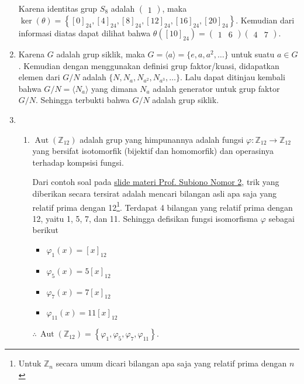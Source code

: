 \documentclass[10pt,openany,a4paper]{article}
\newcommand{\Z}{\mathbb{Z}}
\begin{document}
\begin{enumerate}
\begin{itemize}
    \end{itemize}
    Karena identitas grup $S_8$ adalah $\begin{pmatrix}1\end{pmatrix}$, maka $\ker(\theta)=\left\{[0]_{24},[4]_{24},[8]_{24},[12]_{24},[16]_{24},[20]_{24}\right\}$. Kemudian dari informasi diatas dapat dilihat bahwa $\theta([10]_{24})=\begin{pmatrix}1&6\end{pmatrix}\begin{pmatrix}4&7\end{pmatrix}$.

    \item Karena $G$ adalah grup siklik, maka $G=\langle a \rangle=\{e,a,a^2,\dots\}$ untuk suatu $a\in G$. Kemudian dengan menggunakan definisi grup faktor/kuasi, didapatkan elemen dari $G/N$ adalah $\{N,N_a, N_{a^2}, N_{a^3}, \dots\}$. Lalu dapat ditinjau kembali bahwa $G/N=\langle N_a \rangle$ yang dimana $N_a$ adalah generator untuk grup faktor $G/N$. Sehingga terbukti bahwa $G/N$ adalah grup siklik.

    \item \begin{enumerate}
        \item $\operatorname{Aut}(\mathbb{Z}_{12})$ adalah grup yang himpunannya adalah fungsi $\varphi: \Z_{12}\to \Z_{12}$ yang bersifat isotomorfik (bijektif dan homomorfik) dan operasinya terhadap kompsisi fungsi. 
        
        Dari contoh soal pada \hyperlink{https://sites.google.com/view/aljabar-i/grup/automorpisma-grup?authuser=0}{slide materi Prof. Subiono Nomor 2}, trik yang diberikan secara tersirat adalah mencari bilangan asli apa saja yang relatif prima dengan 12\footnote{Untuk $\Z_n$ secara umum dicari bilangan apa saja yang relatif prima dengan $n$}. Terdapat 4 bilangan yang relatif prima dengan 12, yaitu 1, 5, 7, dan 11. Sehingga defisikan fungsi isomorfisma $\varphi$ sebagai berikut
        \begin{itemize}
            \item $\varphi_1(x)=[x]_{12}$
            \item $\varphi_5(x)=5[x]_{12}$
            \item $\varphi_7(x)=7[x]_{12}$
            \item $\varphi_{11}(x)=11[x]_{12}$
        \end{itemize}
        $\therefore\,\operatorname{Aut}(\mathbb{Z}_{12})=\left\{\varphi_1,\varphi_5,\varphi_7,\varphi_{11}\right\}$.


\end{enumerate}
\end{enumerate}
\end{document}
